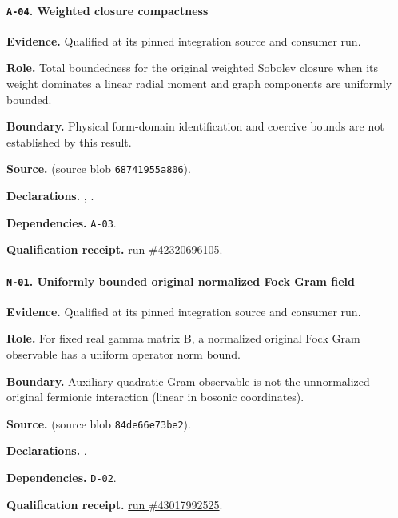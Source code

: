 \paragraph{\texttt{A-04}. Weighted closure compactness}
\noindent\textbf{Evidence.} Qualified at its pinned integration source and consumer run.
\par\noindent\textbf{Role.} Total boundedness for the original weighted Sobolev closure when its weight dominates a linear radial moment and graph components are uniformly bounded.
\par\noindent\textbf{Boundary.} Physical form-domain identification and coercive bounds are not established by this result.
\par\noindent\textbf{Source.}  (source blob \texttt{68741955a806}).
\par\noindent\textbf{Declarations.} , .
\par\noindent\textbf{Dependencies.} \texttt{A-03}.
\par\noindent\textbf{Qualification receipt.} \href{https://github.com/etblink/math/actions/runs/42320696105}{run \#42320696105}.
\medskip

\paragraph{\texttt{N-01}. Uniformly bounded original normalized Fock Gram field}
\noindent\textbf{Evidence.} Qualified at its pinned integration source and consumer run.
\par\noindent\textbf{Role.} For fixed real gamma matrix B, a normalized original Fock Gram observable has a uniform operator norm bound.
\par\noindent\textbf{Boundary.} Auxiliary quadratic-Gram observable is not the unnormalized original fermionic interaction (linear in bosonic coordinates).
\par\noindent\textbf{Source.}  (source blob \texttt{84de66e73be2}).
\par\noindent\textbf{Declarations.} .
\par\noindent\textbf{Dependencies.} \texttt{D-02}.
\par\noindent\textbf{Qualification receipt.} \href{https://github.com/etblink/math/actions/runs/43017992525}{run \#43017992525}.
\medskip

